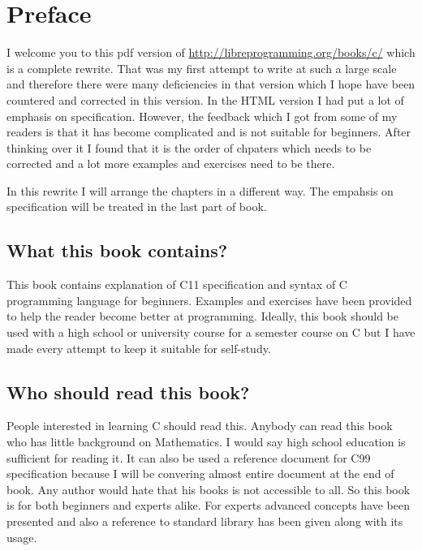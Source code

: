 \chapter{Preface}
I welcome you to this pdf version of 
\url{http://libreprogramming.org/books/c/} which is a complete rewrite. That 
was my first attempt to write at such a large scale and therefore there were 
many deficiencies in that version which I hope have been countered and
corrected in this version. In the HTML version I had put a lot of emphasis on 
specification. However, the feedback which I got from some of my readers is 
that it has become complicated and is not suitable for beginners. After 
thinking over it I found that it is the order of chpaters which needs to be 
corrected and a lot more examples and exercises need to be there.

In this rewrite I will arrange the chapters in a different way. The empahsis on 
specification will be treated in the last part of book.

\section{What this book contains?}
This book contains explanation of C11 specification and syntax of C programming
language for beginners. Examples and exercises have been provided to help the
reader become better at programming. Ideally, this book should be used with a
high school or university course for a semester course on C but I have made
every attempt to keep it suitable for self-study.

\section{Who should read this book?}
People interested in learning C should read this. Anybody can read this book
who has little background on Mathematics. I would say high school education is
sufficient for reading it. It can also be used a reference document for C99
specification because I will be convering almost entire document at the end of
book. Any author would hate that his books is not accessible to all. So this
book is for both beginners and experts alike. For experts advanced concepts
have been presented and also a reference to standard library has been given
along with its usage.

